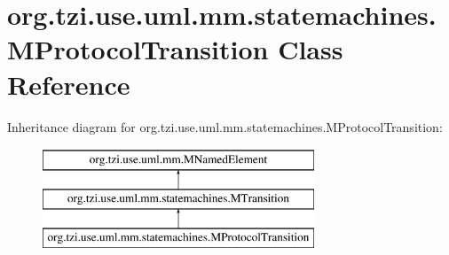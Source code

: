 \hypertarget{classorg_1_1tzi_1_1use_1_1uml_1_1mm_1_1statemachines_1_1_m_protocol_transition}{\section{org.\-tzi.\-use.\-uml.\-mm.\-statemachines.\-M\-Protocol\-Transition Class Reference}
\label{classorg_1_1tzi_1_1use_1_1uml_1_1mm_1_1statemachines_1_1_m_protocol_transition}
}
Inheritance diagram for org.\-tzi.\-use.\-uml.\-mm.\-statemachines.\-M\-Protocol\-Transition\-:\begin{figure}[H]
\begin{center}
\leavevmode
\includegraphics[height=3.000000cm]{classorg_1_1tzi_1_1use_1_1uml_1_1mm_1_1statemachines_1_1_m_protocol_transition}
\end{center}
\end{figure}
